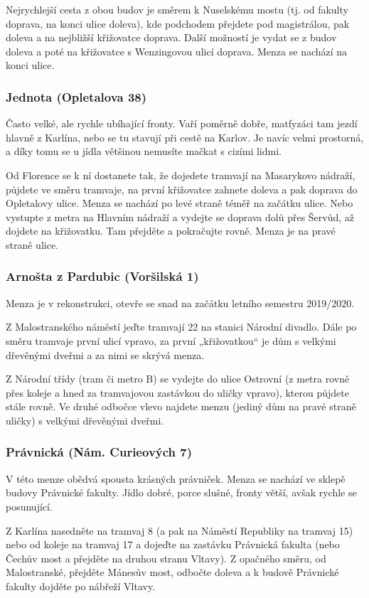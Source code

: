 Nejrychlejší cesta z obou budov je směrem k Nuselskému mostu (tj. od fakulty
doprava, na konci ulice doleva), kde podchodem přejdete pod magistrálou, pak
doleva a na nejbližší křižovatce doprava. Další možností je vydat se z budov
doleva a poté na křižovatce s Wenzingovou ulicí doprava. Menza se nachází na
konci ulice.


\subsubsection{Jednota (Opletalova 38)}
Často velké, ale rychle ubíhající fronty. Vaří poměrně dobře, matfyzáci tam
jezdí hlavně z Karlína, nebo se tu stavují při cestě na Karlov. Je navíc velmi
prostorná, a díky tomu se u jídla většinou nemusíte mačkat s cizími lidmi.

Od Florence se k ní dostanete tak, že dojedete tramvají na Masarykovo nádraží,
půjdete ve směru tramvaje, na první křižovatce zahnete doleva a pak doprava do
Opletalovy ulice. Menza se nachází po levé straně téměř na začátku ulice. Nebo
vystupte z metra na Hlavním nádraží a vydejte se doprava dolů přes Šervůd, až
dojdete na křižovatku. Tam přejděte a pokračujte rovně. Menza je na pravé straně
ulice.


\subsubsection{Arnošta z Pardubic (Voršilská 1)}
Menza je v rekonstrukci, otevře se snad na začátku letního semestru 2019/2020.

Z Malostranského náměstí jeďte tramvají 22 na stanici Národní divadlo. Dále po
směru tramvaje první ulicí vpravo, za první „křižovatkou“ je dům s velkými
dřevěnými dveřmi a za nimi se skrývá menza.

Z Národní třídy (tram či metro B) se vydejte do ulice Ostrovní (z metra rovně
přes koleje a hned za tramvajovou zastávkou do uličky vpravo), kterou půjdete
stále rovně. Ve druhé odbočce vlevo najdete menzu (jediný dům na pravé straně
uličky) s velkými dřevěnými dveřmi.


\subsubsection{Právnická (Nám. Curieových 7)}
V této menze obědvá spousta krásných právniček. Menza se nachází ve sklepě
budovy Právnické fakulty. Jídlo dobré, porce slušné, fronty větší, avšak rychle
se posunující.

Z Karlína nasedněte na tramvaj 8 (a pak na Náměstí Republiky na tramvaj 15) nebo
od koleje na tramvaj 17 a dojeďte na zastávku Právnická fakulta (nebo Čechův
most a přejděte na druhou stranu Vltavy). Z opačného směru, od Malostranské,
přejděte Mánesův most, odbočte doleva a k budově Právnické fakulty dojděte po
nábřeží Vltavy.

